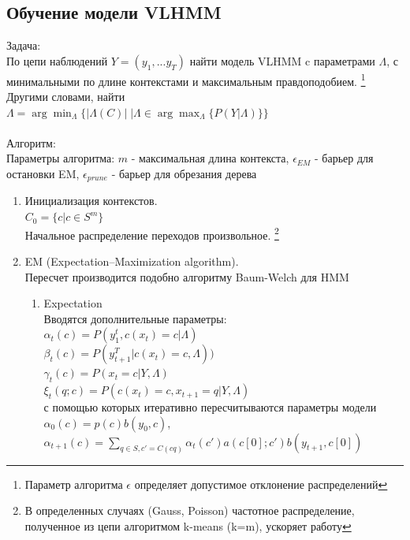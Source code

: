 \documentclass{matmex-diploma-custom}
\begin{document}
{\subsection{Обучение модели VLHMM}
{\large Задача:} 
\\
По цепи наблюдений $ Y = (y_{1}, ... y_{T}) $ найти модель VLHMM c параметрами $ \Lambda$, с минимальными по длине контекстами и максимальным правдоподобием. 
\footnote{Параметр алгоритма $ \epsilon $ определяет допустимое отклонение распределений}
\\
Другими словами, найти
\\
$\Lambda = \arg\!\min_{\Lambda}{\{|\Lambda(C)|\;|\Lambda \in \arg\!\max_{\Lambda}{\{P(Y|\Lambda)\}}\}}$
\\\\
{\large Алгоритм:}
\\
Параметры алгоритма: 
$ m $ - максимальная длина контекста, 
$ \epsilon_{EM} $ - барьер для остановки EM,
$ \epsilon_{prune} $ - барьер для обрезания дерева
\\
\begin{enumerate}
\item Инициализация контекстов.
\\
$ C_{0} = \{c| c\in S^{m}\}$
\\
Начальное распределение переходов произвольное.
\footnote{В определенных случаях (Gauss, Poisson) частотное распределение, полученное из цепи алгоритмом k-means (k=m), ускоряет работу}
\\
\item EM (Expectation–Maximization algorithm).
\\
Пересчет производится подобно алгоритму Baum-Welch для HMM
\\
\begin{enumerate}
\item Expectation
\\
Вводятся дополнительные параметры:
\\
$ \alpha_{t}(c) = P(y_{1}^{t}, c(x_{t})=c| \Lambda)$
\\
$ \beta_{t}(c) = P(y_{t+1}^{T}| c(x_{t})=c, \Lambda))$
\\
$ \gamma_{t}(c) = P(x_{t}=c|Y,\Lambda) $
\\
$ \xi_{t}(q;c) = P(c(x_{t})=c, x_{t+1} = q| Y, \Lambda)$
\\
с помощью которых итеративно пересчитываются параметры модели
\\
$ \alpha_{0}(c) = p(c)b(y_{0},c)$, 
$ \alpha_{t+1}(c) = \sum_{q \in S, c'=C(cq)}{\alpha_{t}(c')a(c[0];c')b(y_{t+1},c[0])}$

\end{enumerate}
\end{enumerate}}
\end{document}
